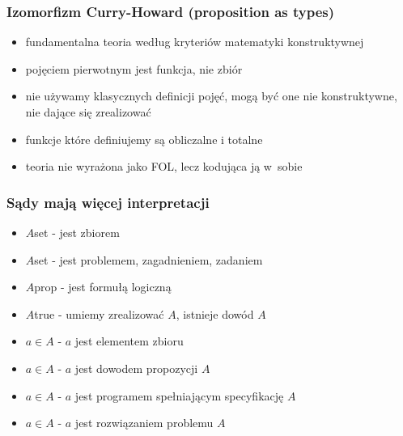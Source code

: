 \documentclass{beamer}
\begin{document}
\begin{frame}
\frametitle{Izomorfizm Curry-Howard (proposition as types)}

\begin{itemize}
 \item fundamentalna teoria według kryteriów matematyki konstruktywnej
 \item pojęciem pierwotnym jest funkcja, nie zbiór
 \item nie używamy klasycznych definicji pojęć, mogą być one nie konstruktywne, nie dające się zrealizować
 \item funkcje które definiujemy są obliczalne i totalne
 \item teoria nie wyrażona jako FOL, lecz kodująca ją w~sobie
\end{itemize}
\end{frame}


\begin{frame}
\frametitle{Sądy mają więcej interpretacji}

\begin{itemize}
 \item $A$\;set -  jest zbiorem
 \item $A$\;set -  jest problemem, zagadnieniem, zadaniem
 \item $A$\;prop - jest formułą logiczną
 \item $A$\;true - umiemy zrealizować $A$, istnieje dowód $A$
 \item $a \in A$ - $a$ jest elementem zbioru
 \item $a \in A$ - $a$ jest dowodem propozycji $A$
 \item $a \in A$ - $a$ jest programem spełniającym specyfikację $A$
 \item $a \in A$ - $a$ jest rozwiązaniem problemu $A$
\end{itemize}
\end{frame}

\end{document}
